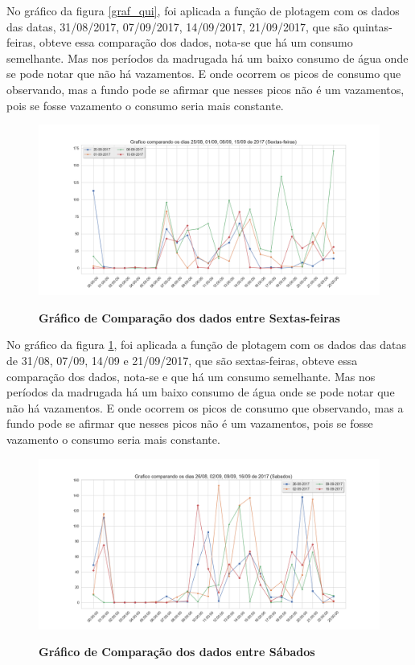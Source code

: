 \par No gráfico da figura \ref{graf_qui}, foi aplicada a função de plotagem com os dados das datas, 31/08/2017, 07/09/2017, 14/09/2017, 21/09/2017, que são quintas-feiras, obteve essa comparação dos dados, nota-se que há um consumo semelhante. Mas nos períodos da madrugada há um baixo consumo de água onde se pode notar que não há vazamentos. E onde ocorrem os picos de consumo que observando, mas a fundo pode se afirmar que nesses picos não é um vazamentos, pois se fosse vazamento o consumo seria mais constante.  

\begin{figure}[ht]
	\caption{\textbf{Gráfico de Comparação dos dados entre Sextas-feiras}}
	\centering
		\includegraphics[width=\textwidth,height=\textheight , keepaspectratio]{figuras/Graficocomparandoosdias25-08,01-09,08-09,15-09de2017(Sextas-feiras)}
		\label{graf_sex}
\end{figure}
\par No gráfico da figura \ref{graf_sex}, foi aplicada a função de plotagem com os dados das datas de 31/08, 07/09, 14/09 e 21/09/2017, que são sextas-feiras, obteve essa comparação dos dados, nota-se e que há um consumo semelhante. Mas nos períodos da madrugada há um baixo consumo de água onde se pode notar que não há vazamentos. E onde ocorrem os picos de consumo que observando, mas a fundo pode se afirmar que nesses picos não é um vazamentos, pois se fosse vazamento o consumo seria mais constante.  

\begin{figure}[ht]
	\caption{\textbf{Gráfico de Comparação dos dados entre Sábados}}
	\centering
		\includegraphics[width=\textwidth,height=\textheight , keepaspectratio]{figuras/Graficocomparandoosdias26-08,02-09,09-09,16-09de2017(Sabados)}
		\label{graf_sab}
\end{figure}

